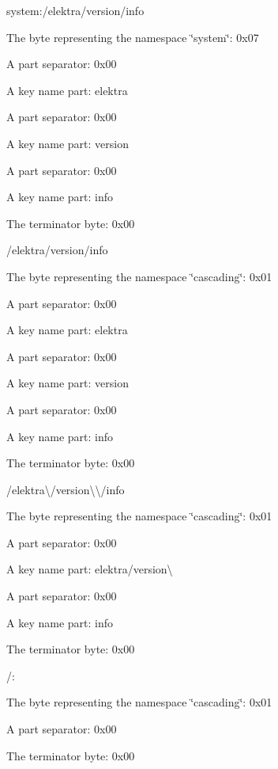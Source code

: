 \begin{DoxyEnumerate}
\item {\ttfamily system\+:/elektra/version/info}
\begin{DoxyItemize}
\item The byte representing the namespace \char`\"{}system\char`\"{}\+: {\ttfamily 0x07}
\item A part separator\+: {\ttfamily 0x00}
\item A key name part\+: {\ttfamily elektra}
\item A part separator\+: {\ttfamily 0x00}
\item A key name part\+: {\ttfamily version}
\item A part separator\+: {\ttfamily 0x00}
\item A key name part\+: {\ttfamily info}
\item The terminator byte\+: {\ttfamily 0x00}
\end{DoxyItemize}
\item {\ttfamily /elektra/version/info}
\begin{DoxyItemize}
\item The byte representing the namespace \char`\"{}cascading\char`\"{}\+: {\ttfamily 0x01}
\item A part separator\+: {\ttfamily 0x00}
\item A key name part\+: {\ttfamily elektra}
\item A part separator\+: {\ttfamily 0x00}
\item A key name part\+: {\ttfamily version}
\item A part separator\+: {\ttfamily 0x00}
\item A key name part\+: {\ttfamily info}
\item The terminator byte\+: {\ttfamily 0x00}
\end{DoxyItemize}
\item {\ttfamily /elektra\textbackslash{}/version\textbackslash{}\textbackslash{}/info}
\begin{DoxyItemize}
\item The byte representing the namespace \char`\"{}cascading\char`\"{}\+: {\ttfamily 0x01}
\item A part separator\+: {\ttfamily 0x00}
\item A key name part\+: {\ttfamily elektra/version\textbackslash{}}
\item A part separator\+: {\ttfamily 0x00}
\item A key name part\+: {\ttfamily info}
\item The terminator byte\+: {\ttfamily 0x00}
\end{DoxyItemize}
\item {\ttfamily /}\+:
\begin{DoxyItemize}
\item The byte representing the namespace \char`\"{}cascading\char`\"{}\+: {\ttfamily 0x01}
\item A part separator\+: {\ttfamily 0x00}
\item The terminator byte\+: {\ttfamily 0x00}
\end{DoxyItemize}
\end{DoxyEnumerate}


